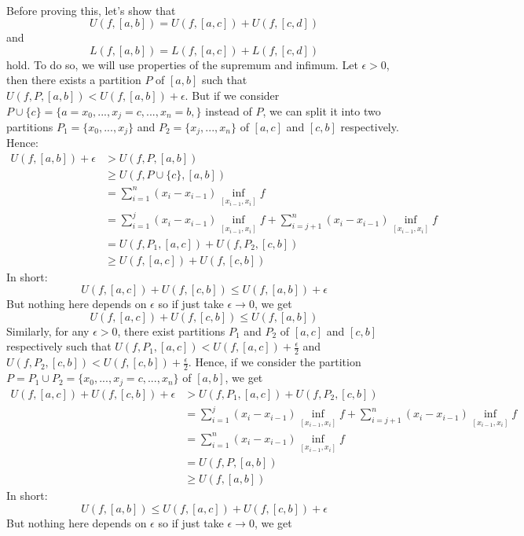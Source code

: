 \begin{solution}
    \\ Before proving this, let's show that
    $$U(f, [a,b]) = U(f, [a,c]) + U(f, [c,d])$$
    and 
    $$L(f, [a,b]) = L(f, [a,c]) + L(f, [c,d])$$
    hold. To do so, we will use properties of the supremum and infimum. Let $\epsilon > 0$, then there exists a partition $P$ of $[a,b]$ such that $U(f, P, [a,b]) < U(f, [a,b]) + \epsilon$. But if we consider $P \cup \{c\} = \{a = x_0, ..., x_j = c, ..., x_n = b,\}$ instead of $P$, we can split it into two partitions $P_1 = \{x_0, ..., x_j\}$ and $P_2 = \{x_j, ..., x_n\}$ of $[a,c]$ and $[c,b]$ respectively. Hence:
    \begin{align*}
        U(f, [a,b]) + \epsilon &> U(f, P, [a,b]) \\
        &\geq U(f, P\cup \{c\}, [a,b]) \\
        &= \sum_{i=1}^{n}(x_i - x_{i-1})\inf_{[x_{i-1}, x_i]}f\\
        &= \sum_{i=1}^{j}(x_i - x_{i-1})\inf_{[x_{i-1}, x_i]}f + \sum_{i=j+1}^{n}(x_i - x_{i-1})\inf_{[x_{i-1}, x_i]}f \\
        &= U(f, P_1, [a,c]) + U(f, P_2, [c,b]) \\
        &\geq U(f, [a,c]) + U(f, [c,b])
    \end{align*}
    In short:
    $$U(f, [a,c]) + U(f, [c,b]) \leq U(f, [a,b]) + \epsilon$$
    But nothing here depends on $\epsilon$ so if just take $\epsilon \rightarrow 0$, we get
    $$U(f, [a,c]) + U(f, [c,b]) \leq U(f, [a,b])$$
    Similarly, for any $\epsilon > 0$, there exist partitions $P_1$ and $P_2$ of $[a,c]$ and $[c,b]$ respectively such that $U(f, P_1, [a,c]) < U(f, [a,c]) + \frac{\epsilon}{2}$ and $U(f, P_2, [c,b]) < U(f, [c,b]) + \frac{\epsilon}{2}$. Hence, if we consider the partition $P = P_1 \cup P_2 =  \{x_0, ..., x_j = c, ..., x_n\}$ of $[a,b]$, we get
    \begin{align*}
        U(f, [a,c]) + U(f, [c,b]) + \epsilon &> U(f, P_1, [a,c]) + U(f, P_2, [c,b]) \\
        &= \sum_{i=1}^{j}(x_i - x_{i-1})\inf_{[x_{i-1}, x_i]}f + \sum_{i=j+1}^{n}(x_i - x_{i-1})\inf_{[x_{i-1}, x_i]}f \\
        &= \sum_{i=1}^{n}(x_i - x_{i-1})\inf_{[x_{i-1}, x_i]}f\\
        &= U(f, P, [a,b]) \\
        &\geq U(f, [a,b])
    \end{align*}
    In short:
    $$U(f, [a,b]) \leq U(f, [a,c]) + U(f, [c,b]) + \epsilon$$
    But nothing here depends on $\epsilon$ so if just take $\epsilon \rightarrow 0$, we get

\end{solution}
